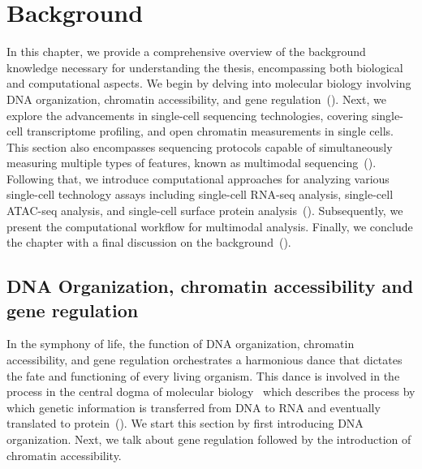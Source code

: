 %
%
\chapter{Background}
\label{cha:background}
\graphicspath{{chapter2/figs/}}

In this chapter, we provide a comprehensive overview of the background knowledge necessary for understanding the thesis, encompassing both biological and computational aspects. We begin by delving into molecular biology involving DNA organization, chromatin accessibility, and gene regulation~(). Next, we explore the advancements in single-cell sequencing technologies, covering single-cell transcriptome profiling, and open chromatin measurements in single cells. This section also encompasses sequencing protocols capable of simultaneously measuring multiple types of features, known as multimodal sequencing~(). Following that, we introduce computational approaches for analyzing various single-cell technology assays including single-cell RNA-seq analysis, single-cell ATAC-seq analysis, and single-cell surface protein analysis~(). Subsequently, we present the computational workflow for multimodal analysis. Finally, we conclude the chapter with a final discussion on the background~().


\section{DNA Organization, chromatin accessibility and gene regulation}
\label{background:DNA_Chromatin_Regulation}
In the symphony of life, the function of DNA organization, chromatin accessibility, and gene regulation orchestrates a harmonious dance that dictates the fate and functioning of every living organism. This dance is involved in the process in the central dogma of molecular biology~\citep{crick1970central} which describes the process by which genetic information is transferred from DNA to RNA and eventually translated to protein~(). We start this section by first introducing DNA organization. Next, we talk about gene regulation followed by the introduction of chromatin accessibility.

